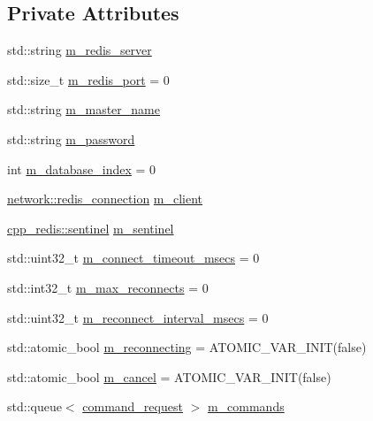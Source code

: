 \subsection*{Private Attributes}
\begin{DoxyCompactItemize}
\item 
std\+::string \hyperlink{classcpp__redis_1_1client_acbe90e4208d17c8769f38c131c4872c1}{m\+\_\+redis\+\_\+server}
\item 
std\+::size\+\_\+t \hyperlink{classcpp__redis_1_1client_a5f54838ce91f92a32383a27224a78f2f}{m\+\_\+redis\+\_\+port} = 0
\item 
std\+::string \hyperlink{classcpp__redis_1_1client_ab9ccf298c144e30b924e87fba89dbc4c}{m\+\_\+master\+\_\+name}
\item 
std\+::string \hyperlink{classcpp__redis_1_1client_aa3f271f2e05a020afca0c45cee0a97a5}{m\+\_\+password}
\item 
int \hyperlink{classcpp__redis_1_1client_acfc4137394507418cd4a81021da3aee3}{m\+\_\+database\+\_\+index} = 0
\item 
\hyperlink{classcpp__redis_1_1network_1_1redis__connection}{network\+::redis\+\_\+connection} \hyperlink{classcpp__redis_1_1client_a20c60a836610c74ea13da68668facad2}{m\+\_\+client}
\item 
\hyperlink{classcpp__redis_1_1sentinel}{cpp\+\_\+redis\+::sentinel} \hyperlink{classcpp__redis_1_1client_a79979ccbffa192119ae2f0c03aaa6130}{m\+\_\+sentinel}
\item 
std\+::uint32\+\_\+t \hyperlink{classcpp__redis_1_1client_ad8ca54d72d5a893b8455da2b87cd143c}{m\+\_\+connect\+\_\+timeout\+\_\+msecs} = 0
\item 
std\+::int32\+\_\+t \hyperlink{classcpp__redis_1_1client_ac7e62a03f54baa0a18fa48c90b595d85}{m\+\_\+max\+\_\+reconnects} = 0
\item 
std\+::uint32\+\_\+t \hyperlink{classcpp__redis_1_1client_adb478e35d9d590bac2651ae30be3e7f4}{m\+\_\+reconnect\+\_\+interval\+\_\+msecs} = 0
\item 
std\+::atomic\+\_\+bool \hyperlink{classcpp__redis_1_1client_a1495e363fa8a95e5fbbf95270abfe584}{m\+\_\+reconnecting} = A\+T\+O\+M\+I\+C\+\_\+\+V\+A\+R\+\_\+\+I\+N\+IT(false)
\item 
std\+::atomic\+\_\+bool \hyperlink{classcpp__redis_1_1client_ac69767309023f573c16dd855bd7a3c83}{m\+\_\+cancel} = A\+T\+O\+M\+I\+C\+\_\+\+V\+A\+R\+\_\+\+I\+N\+IT(false)
\item 
std\+::queue$<$ \hyperlink{structcpp__redis_1_1client_1_1command__request}{command\+\_\+request} $>$ \hyperlink{classcpp__redis_1_1client_ac59027c12904b52b41d07eeab9288fc0}{m\+\_\+commands}

\end{DoxyCompactItemize}
